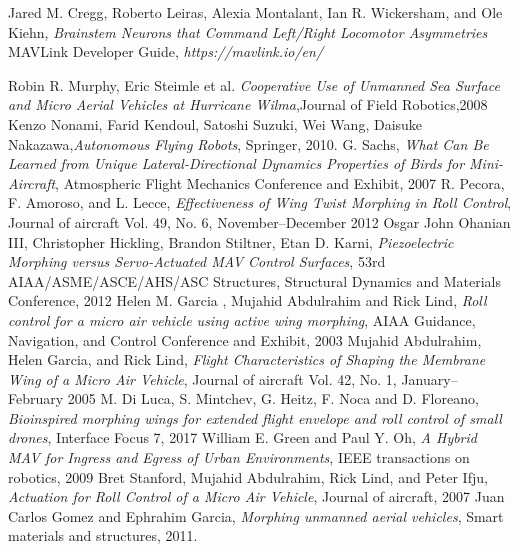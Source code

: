 \documentclass[12pt,a4paper]{article}
\begin{document}
\clearpage
\lhead{ }
\begin{thebibliography}{100}
	
	Jared M. Cregg, Roberto Leiras, Alexia Montalant, Ian R. Wickersham, and Ole Kiehn, \textit{Brainstem Neurons that Command Left/Right Locomotor Asymmetries} 
	 MAVLink Developer Guide, \textit{https://mavlink.io/en/}
	
	 Robin R. Murphy, Eric Steimle et al. \textit{Cooperative Use of Unmanned Sea Surface and Micro Aerial Vehicles at Hurricane Wilma},Journal of Field Robotics,2008
	     Kenzo Nonami, Farid Kendoul, Satoshi Suzuki, Wei Wang, Daisuke Nakazawa,\textit{Autonomous Flying Robots}, Springer, 2010.
	 G. Sachs, \textit{What Can Be Learned from Unique Lateral-Directional Dynamics Properties of Birds for Mini-Aircraft}, Atmospheric Flight Mechanics Conference and Exhibit, 2007
	 R. Pecora, F. Amoroso, and L. Lecce, \textit{Effectiveness of Wing Twist Morphing in Roll Control}, Journal of aircraft Vol. 49, No. 6, November–December 2012
	 Osgar John Ohanian III, Christopher Hickling, Brandon Stiltner, Etan D. Karni, \textit{Piezoelectric Morphing versus Servo-Actuated MAV Control Surfaces}, 53rd AIAA/ASME/ASCE/AHS/ASC Structures, Structural Dynamics and Materials Conference, 2012
	 Helen M. Garcia , Mujahid Abdulrahim and Rick Lind, \textit{Roll control for a micro air vehicle using active wing morphing}, AIAA Guidance, Navigation, and Control Conference and Exhibit, 2003
	 Mujahid Abdulrahim, Helen Garcia, and Rick Lind, \textit{Flight Characteristics of Shaping the Membrane Wing of a Micro Air Vehicle}, Journal of aircraft Vol. 42, No. 1, January–February 2005
	 M. Di Luca, S. Mintchev, G. Heitz, F. Noca and D. Floreano, \textit{Bioinspired morphing wings for extended flight envelope and roll control of small drones}, Interface Focus 7, 2017
	 William E. Green and Paul Y. Oh, \textit{A Hybrid MAV for Ingress and Egress of Urban Environments}, IEEE transactions on robotics, 2009
	 Bret Stanford, Mujahid Abdulrahim, Rick Lind, and Peter Ifju, \textit{Actuation for Roll Control of a Micro Air Vehicle}, Journal of aircraft,  2007
	 Juan Carlos Gomez and Ephrahim Garcia, \textit{Morphing unmanned aerial vehicles}, Smart materials and structures, 2011.

\end{thebibliography}
\end{document}
